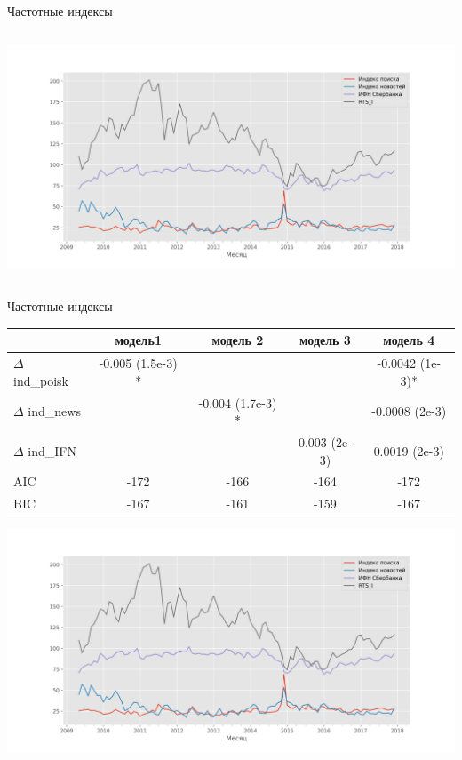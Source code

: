 \documentclass[c, dvipsnames]{beamer}  %
\begin{document}
\begin{frame}{Частотные индексы}
\begin{center}
\begin{columns}
\begin{column}{.68\linewidth}
\includegraphics[scale=0.28]{allind.png}
\end{column}
\end{columns}
\end{center}
\end{frame}




 \begin{frame}{Частотные индексы}

\begin{center}
\scriptsize
\begin{tabular}{lcccc}
\hline
                                           & модель1                 &           модель 2        &    модель 3          &    модель 4 \\
\hline
$\Delta$  ind\_poisk      &  -0.005 (1.5e-3) *  &                                      &                                 &   -0.0042  (1e-3)* \\
$\Delta$  ind\_news      &                                    &    -0.004 (1.7e-3) *    &                                 &   -0.0008  (2e-3)\\
 $\Delta$ ind\_IFN         &                                    &                                       &   0.003 (2e-3)     &     0.0019  (2e-3) \\
 AIC  &   -172   &  -166 &   -164  &   -172  \\
 BIC  &   -167  &   -161  &  -159  &   -167  \\
 \hline
 \end{tabular}

\hfill

 \includegraphics[scale=0.35]{allind.png}
\end{center}
\end{frame}
\end{document}
